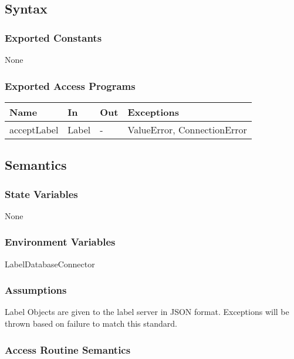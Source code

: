 \documentclass[12pt, titlepage]{article}
\begin{document}
  \subsection{Syntax}


  
  \subsubsection{Exported Constants}
  None
  \subsubsection{Exported Access Programs}
  
  \begin{center}
  \begin{tabular}{p{2cm} p{4cm} p{4cm} p{2cm}}
  \hline
  \textbf{Name} & \textbf{In} & \textbf{Out} & \textbf{Exceptions} \\
  \hline
  acceptLabel & Label & - & ValueError, ConnectionError \\
  \hline
  \end{tabular}
  \end{center}
  
  \subsection{Semantics}
  
  \subsubsection{State Variables}
  
  None
  
  \subsubsection{Environment Variables}
  
  LabelDatabaseConnector
  
  \subsubsection{Assumptions}
  
  Label Objects are given to the label server in JSON format. Exceptions will be thrown based on failure to match this standard.
  
  \subsubsection{Access Routine Semantics}
  
\end{document}
